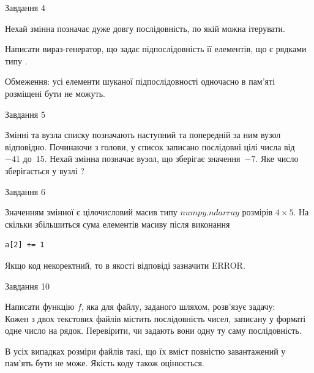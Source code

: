 \documentclass[12pt, ukrainian]{article}
\begin{document}
{               
{\begin{center}Завдання {4}\end{center}}
\vspace{-6mm}
Нехай змінна  позначає дуже довгу послідовність, по якій можна ітерувати.

Написати вираз-генератор, що задає підпослідовність її елементів, що є рядками типу .

Обмеження: усі елементи шуканої підпослідовності одночасно в пам'яті розміщені бути не можуть.\par

\vspace{10mm}
               
{\begin{center}Завдання {5}\end{center}}
\vspace{-6mm}
Змінні  та  вузла списку позначають наступний та попередній за ним вузол відповідно. Починаючи з голови, у список записано послідовні цілі числа від~$-41$ до~$15$. Нехай змінна  позначає вузол, що зберігає значення~$-7$.
Яке число зберігається у вузлі  ?\par

               
{\begin{center}Завдання {6}\end{center}}
\vspace{-6mm}
Значенням змінної  є цілочисловий масив типу $numpy.ndarray$ розмірів $4{\times}5$. На скільки збільшиться сума елементів масиву  після виконання
\begin{verbatim}
a[2] += 1
\end{verbatim}


Якщо код некоректний, то в якості відповіді зазначити ERROR.\par

               
{\begin{center}Завдання {10}\end{center}}
\vspace{-6mm}

Написати функцію $f$, яка для файлу, заданого шляхом, розв’язує задачу:\\ Кожен з двох текстових файлів містить послідовність чисел, записану у форматі одне число на рядок.  Перевірити, чи задають вони одну ту саму послідовність.

В усіх випадках розміри файлів такі, що їх вміст повністю завантажений у пам'ять бути не може. Якість коду також оцінюється.



}
\end{document}
